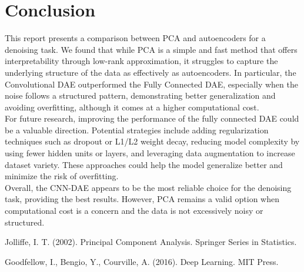 \documentclass[10pt,conference,compsocconf]{IEEEtran}
\begin{document}
\section{Conclusion}
This report presents a comparison between PCA and autoencoders for a denoising task. We found that while PCA is a simple and fast method that offers interpretability 
through low-rank approximation, it struggles to capture the underlying structure of the data as effectively as autoencoders. In particular, the Convolutional 
DAE outperformed the Fully Connected DAE, especially when the noise follows a structured pattern, demonstrating better generalization and avoiding overfitting, 
although it comes at a higher computational cost.\\
For future research, improving the performance of the fully connected DAE could be a valuable direction. Potential strategies include adding regularization techniques such as dropout or 
L1/L2 weight decay, reducing model complexity by using fewer hidden units or layers, and leveraging data augmentation to increase dataset variety. These approaches could help the model generalize better and minimize the risk of overfitting.\\
Overall, the CNN-DAE appears to be the most reliable choice for the denoising task, providing the best results. However, PCA remains a valid option when computational cost is a concern and the data is not excessively noisy or structured.


\begin{thebibliography}{9}
Jolliffe, I. T. (2002). Principal Component Analysis. Springer Series in Statistics.

Goodfellow, I., Bengio, Y., Courville, A. (2016). Deep Learning. MIT Press.
\end{thebibliography}
\end{document}
